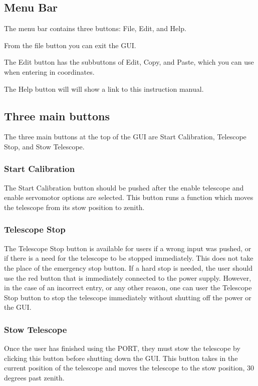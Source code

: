 \documentclass{article}
\begin{document}
\subsection{Menu Bar}

The menu bar contains three buttons: File, Edit, and Help.

From the file button you can exit the GUI.

The Edit button has the subbuttons of Edit, Copy, and Paste, which you can use when entering in coordinates.

The Help button will will show a link to this instruction manual.

\subsection{Three main buttons}

The three main buttons at the top of the GUI are Start Calibration, Telescope Stop, and Stow Telescope.

\subsubsection{Start Calibration}

The Start Calibration button should be pushed after the enable telescope and enable servomotor options are selected. This button runs a function which moves the telescope from its stow position to zenith.

\subsubsection{Telescope Stop}

The Telescope Stop button is available for users if a wrong input was pushed, or if there is a need for the telescope to be stopped immediately. This does not take the place of the emergency stop button. If a hard stop is needed, the user should use the red button that is immediately connected to the power supply. However, in the case of an incorrect entry, or any other reason, one can user the Telescope Stop button to stop the telescope immediately without shutting off the power or the GUI.

\subsubsection{Stow Telescope}

Once the user has finished using the PORT, they must stow the telescope by clicking this button before shutting down the GUI. This button takes in the current position of the telescope and moves the telescope to the stow position, 30 degrees past zenith.
\end{document}
